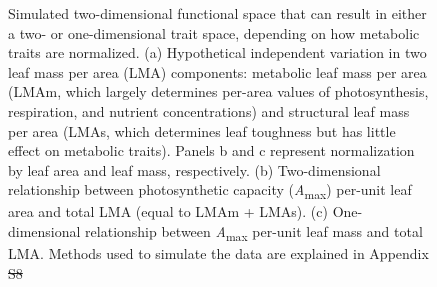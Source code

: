 \documentclass[
  12pt,
  letterpaper,
  DIV=11,
  numbers=noendperiod]{scrartcl}
\providecommand{\DIFadd}[1]{{\protect\color{blue}\uwave{#1}}} %
\providecommand{\DIFdel}[1]{{\protect\color{red}\sout{#1}}}                      %
\providecommand{\DIFaddFL}[1]{\DIFadd{#1}} %
\providecommand{\DIFdelFL}[1]{\DIFdel{#1}} %
\providecommand{\DIFaddbeginFL}{} %
\providecommand{\DIFaddendFL}{} %
\providecommand{\DIFdelbeginFL}{} %
\providecommand{\DIFdelendFL}{} %
\newcommand{\DIFscaledelfig}{0.5}
\newlength{\DIFdelgraphicswidth} %
\newlength{\DIFdelgraphicsheight} %
\newcommand{\DIFaddincludegraphics}[2][]{{\color{blue}\fbox{\DIFOincludegraphics[#1]{#2}}}} %
\newcommand{\DIFdelincludegraphics}[2][]{%
\sbox{\DIFdelgraphicsbox}{\DIFOincludegraphics[#1]{#2}}%
\settoboxwidth{\DIFdelgraphicswidth}{\DIFdelgraphicsbox} %
\settoboxtotalheight{\DIFdelgraphicsheight}{\DIFdelgraphicsbox} %
\scalebox{\DIFscaledelfig}{%
\parbox[b]{\DIFdelgraphicswidth}{\usebox{\DIFdelgraphicsbox}\\[-\baselineskip] \rule{\DIFdelgraphicswidth}{0em}}\llap{\resizebox{\DIFdelgraphicswidth}{\DIFdelgraphicsheight}{%
\setlength{\unitlength}{\DIFdelgraphicswidth}%
\begin{picture}(1,1)%
\thicklines\linethickness{2pt} %
{\color[rgb]{1,0,0}\put(0,0){\framebox(1,1){}}}%
{\color[rgb]{1,0,0}\put(0,0){\line( 1,1){1}}}%
{\color[rgb]{1,0,0}\put(0,1){\line(1,-1){1}}}%
\end{picture}%
}\hspace*{3pt}}} %
} %
\DeclareRobustCommand{\DIFaddbeginFL}{\DIFOaddbeginFL \let\includegraphics\DIFaddincludegraphics} %
\DeclareRobustCommand{\DIFaddendFL}{\DIFOaddendFL \let\includegraphics\DIFOincludegraphics} %
\DeclareRobustCommand{\DIFdelbeginFL}{\DIFOdelbeginFL \let\includegraphics\DIFdelincludegraphics} %
\DeclareRobustCommand{\DIFdelendFL}{\DIFOaddendFL \let\includegraphics\DIFOincludegraphics} %
\begin{document}
\begin{figure}


\caption{\label{fig-hypo}Simulated two-dimensional functional space that
can result in either a two- or one-dimensional trait space, depending on
how metabolic traits are normalized. (a) Hypothetical independent
variation in two leaf mass per area (LMA) components: metabolic leaf
mass per area (LMAm, which largely determines per-area values of
photosynthesis, respiration, and nutrient concentrations) and structural
leaf mass per area (LMAs, which determines leaf toughness but has little
effect on metabolic traits). Panels b and c represent normalization by
leaf area and leaf mass, respectively. (b) Two-dimensional relationship
between photosynthetic capacity (\emph{A}\textsubscript{max}) per-unit
leaf area and total LMA (equal to LMAm + LMAs). (c) One-dimensional
relationship between \emph{A}\textsubscript{max} per-unit leaf mass and
total LMA. Methods used to simulate the data are explained in Appendix
\DIFdelbeginFL \DIFdelFL{S8}\DIFdelendFL \DIFaddbeginFL \DIFaddFL{S6}\DIFaddendFL }

\end{figure}%

\newpage
\end{document}
